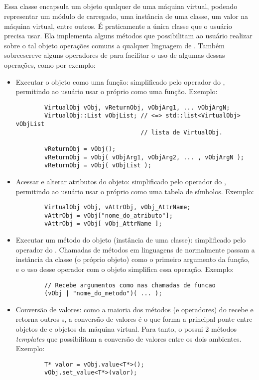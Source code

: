   \subsection{\VObj{}}
  \label{sec:atividades:opa:vobj}
  Essa classe encapsula um objeto qualquer de uma máquina virtual, podendo
  representar um módulo de \script{} carregado, uma instância de uma classe, um
  valor na máquina virtual, entre outros. É praticamente a única classe que o
  usuário precisa usar. Ela implementa alguns métodos que possibilitam ao
  usuário realizar sobre o tal objeto operações comuns a qualquer linguagem de
  \script{}. Também sobreescreve alguns operadores de \CXX{} para facilitar o
  uso de algumas dessas operações, como por exemplo:
  \begin{itemize}
    \item Executar o objeto como uma função: simplificado pelo operador \lang{()}
      do \CXX{}, permitindo ao usuário usar o próprio \VObj{} como uma função. Exemplo:
      \begin{lstlisting}
        VirtualObj vObj, vReturnObj, vObjArg1, ... vObjArgN; 
        VirtualObj::List vObjList; // <=> std::list<VirtualObj> vObjList
                                   // lista de VirtualObj.
                                   
        vReturnObj = vObj();
        vReturnObj = vObj( vObjArg1, vObjArg2, ... , vObjArgN );
        vReturnObj = vObj( vObjList );
      \end{lstlisting}
    \item Acessar e alterar atributos do objeto: simplificado pelo operador
      \lang{[]} do \CXX{}, permitindo ao usuário usar o próprio \VObj{} como uma
      tabela de símbolos. Exemplo:
      \begin{lstlisting}
        VirtualObj vObj, vAttrObj, vObj_AttrName;
        vAttrObj = vObj["nome_do_atributo"];
        vAttrObj = vObj[ vObj_AttrName ];
      \end{lstlisting}
    \item Executar um método do objeto (instância de uma classe): simplificado pelo
      operador \lang{|} do \CXX{}. Chamadas de métodos em linguagens de \script{} normalmente
      passam a instância da classe (o próprio objeto) como o primeiro argumento da
      função, e o uso desse operador com o objeto simplifica essa operação. Exemplo: 
      \begin{lstlisting}
        // Recebe argumentos como nas chamadas de funcao
        (vObj | "nome_do_metodo")( ... );
      \end{lstlisting}
    \item Conversão de valores: como a maioria dos métodos (e operadores) do
      \VObj{} recebe e retorna outros \VObj{}s, a conversão de valores é o que forma a
      principal ponte entre objetos de \CXX{} e objetos da máquina virtual. Para tanto, o \VObj{}
      possui 2 métodos \textit{templates} que possibilitam a conversão de valores entre
      os dois ambientes. Exemplo:
      \begin{lstlisting}
        T* valor = vObj.value<T*>();
        vObj.set_value<T*>(valor);
        

\end{lstlisting}
\end{itemize}
